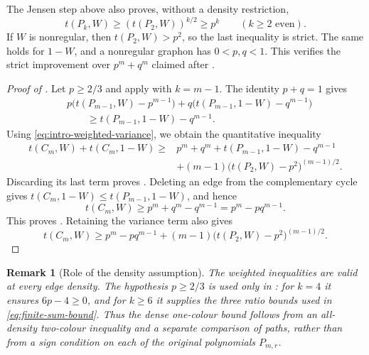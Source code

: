 \documentclass[11pt]{article}
\newtheorem{remark}[theorem]{Remark}
\numberwithin{equation}{section}
\newcommand{\tC}[2]{t(C_{#1},#2)}
\newcommand{\tP}[2]{t(P_{#1},#2)}
\begin{document}
The Jensen step above also proves, without a density restriction,
\[
  \tP kW\ge(\tP2W)^{k/2}\ge p^k
  \qquad(k\ge2\text{ even}).
\]
If $W$ is nonregular, then $\tP2W>p^2$, so the last inequality
is strict. The same holds for $1-W$, and a nonregular graphon
has $0<p,q<1$. This verifies the strict improvement over
$p^m+q^m$ claimed after .

\begin{proof}[Proof of ]
  Let $p\ge2/3$ and apply 
  with $k=m-1$. The identity $p+q=1$ gives
  \begin{align*}
    &p\bigl(\tP{m-1}W-p^{m-1}\bigr)
       +q\bigl(\tP{m-1}{1-W}-q^{m-1}\bigr)\\
    &\qquad\ge\tP{m-1}{1-W}-q^{m-1}.
  \end{align*}
  Using \eqref{eq:intro-weighted-variance}, we obtain the
  quantitative inequality
  \begin{equation}\label{eq:dense-variance-bound}
    \begin{aligned}
      \tC mW+\tC m{1-W}\ge{}&p^m+q^m
        +\tP{m-1}{1-W}-q^{m-1}\\
        &+(m-1)\bigl(\tP2W-p^2\bigr)^{(m-1)/2}.
    \end{aligned}
  \end{equation}
  Discarding its last term proves .
  Deleting an edge from the complementary cycle gives
  $\tC m{1-W}\le\tP{m-1}{1-W}$, and hence
  \[
    \tC mW\ge p^m+q^m-q^{m-1}=p^m-pq^{m-1}.
  \]
  This proves . Retaining the variance term also
  gives
  \begin{equation}\label{eq:one-colour-variance-bound}
    \tC mW\ge p^m-pq^{m-1}
      +(m-1)\bigl(\tP2W-p^2\bigr)^{(m-1)/2}.
  \end{equation}
\end{proof}

\begin{remark}[Role of the density assumption]
\label{rem:pge23-threshold}
  The weighted inequalities are valid at every edge density.
  The hypothesis $p\ge2/3$ is used only in
  : for $k=4$ it ensures
  $6p-4\ge0$, and for $k\ge6$ it supplies the three ratio bounds
  used in \eqref{eq:finite-sum-bound}. Thus the dense one-colour
  bound follows from an all-density two-colour inequality and a
  separate comparison of paths, rather than from a sign condition
  on each of the original polynomials $P_{m,r}$.
\end{remark}
\end{document}
